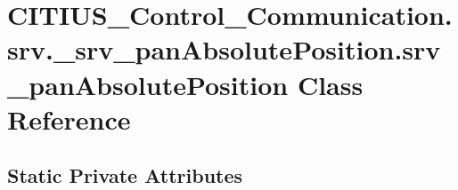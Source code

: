 \hypertarget{class_c_i_t_i_u_s___control___communication_1_1srv_1_1__srv__pan_absolute_position_1_1srv__pan_absolute_position}{\section{\-C\-I\-T\-I\-U\-S\-\_\-\-Control\-\_\-\-Communication.\-srv.\-\_\-srv\-\_\-pan\-Absolute\-Position.\-srv\-\_\-pan\-Absolute\-Position \-Class \-Reference}
\label{class_c_i_t_i_u_s___control___communication_1_1srv_1_1__srv__pan_absolute_position_1_1srv__pan_absolute_position}
}
\subsection*{\-Static \-Private \-Attributes}

